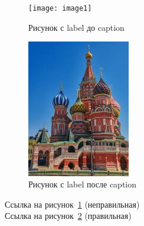 \documentclass{article}
\begin{document}
\begin{figure}[ht]
    \centering
    \texttt{[image: image1]}
    \label{fig:before}
    \caption{Рисунок с label до caption}
\end{figure}
\begin{figure}[ht]
    \centering
    \includegraphics[width=0.4\textwidth]{image2}
    \caption{Рисунок с label после caption}
    \label{fig:after}
\end{figure}
Ссылка на рисунок~\ref{fig:before} (неправильная)\\
Ссылка на рисунок~\ref{fig:after} (правильная)
\end{document}
